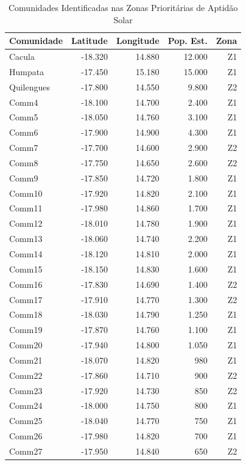 \documentclass[12pt, a4paper]{article}
\begin{document}
{{{{{{{{{{{{\begin{table}[H]
\centering
\caption{Comunidades Identificadas nas Zonas Prioritárias de Aptidão Solar}
\label{tab:communities}
\footnotesize
\begin{tabular}{|l|r|r|r|r|}
\hline
\textbf{Comunidade} & \textbf{Latitude} & \textbf{Longitude} & \textbf{Pop. Est.} & \textbf{Zona} \\
\hline
Cacula & -18.320 & 14.880 & 12.000 & Z1 \\
Humpata & -17.450 & 15.180 & 15.000 & Z1 \\
Quilengues & -17.800 & 14.550 & 9.800 & Z2 \\
Comm4 & -18.100 & 14.700 & 2.400 & Z1 \\
Comm5 & -18.050 & 14.760 & 3.100 & Z1 \\
Comm6 & -17.900 & 14.900 & 4.300 & Z1 \\
Comm7 & -17.700 & 14.600 & 2.900 & Z2 \\
Comm8 & -17.750 & 14.650 & 2.600 & Z2 \\
Comm9 & -17.850 & 14.720 & 1.800 & Z1 \\
Comm10 & -17.920 & 14.820 & 2.100 & Z1 \\
Comm11 & -17.980 & 14.860 & 1.700 & Z1 \\
Comm12 & -18.010 & 14.780 & 1.900 & Z1 \\
Comm13 & -18.060 & 14.740 & 2.200 & Z1 \\
Comm14 & -18.120 & 14.810 & 2.000 & Z1 \\
Comm15 & -18.150 & 14.830 & 1.600 & Z1 \\
Comm16 & -17.830 & 14.690 & 1.400 & Z2 \\
Comm17 & -17.910 & 14.770 & 1.300 & Z2 \\
Comm18 & -18.030 & 14.790 & 1.250 & Z1 \\
Comm19 & -17.870 & 14.760 & 1.100 & Z1 \\
Comm20 & -17.940 & 14.800 & 1.050 & Z1 \\
Comm21 & -18.070 & 14.820 & 980 & Z1 \\
Comm22 & -17.860 & 14.710 & 900 & Z2 \\
Comm23 & -17.920 & 14.730 & 850 & Z2 \\
Comm24 & -18.000 & 14.750 & 800 & Z1 \\
Comm25 & -18.040 & 14.770 & 750 & Z1 \\
Comm26 & -17.980 & 14.820 & 700 & Z1 \\
Comm27 & -17.950 & 14.840 & 650 & Z2 \\

\end{tabular}
\end{table}}}}}}}}}}}}}
\end{document}
